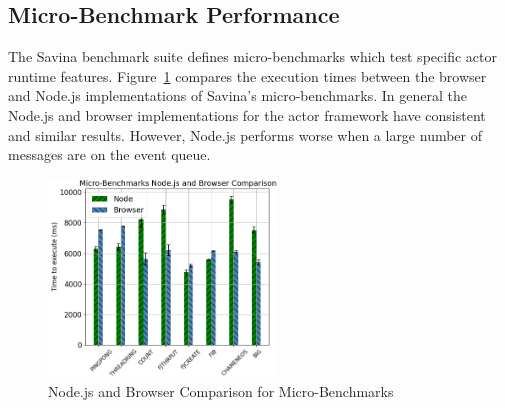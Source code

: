 \documentclass[lettersize,journal]{IEEEtran}
\begin{document}
\subsection{Micro-Benchmark Performance}
The Savina benchmark suite defines micro-benchmarks which test specific actor runtime features. Figure~\ref{fig:micro} compares the execution times between the browser and Node.js implementations of Savina's micro-benchmarks. In general the Node.js and browser implementations for the actor framework have consistent and similar results. However, Node.js performs worse when a large number of messages are on the event queue.
\begin{figure}[H]
    \begin{centering}
        \includegraphics[width=230px]{resources/micro.png}
        \caption{Node.js and Browser Comparison for Micro-Benchmarks}\label{fig:micro}
    \end{centering}
\end{figure}
\end{document}
